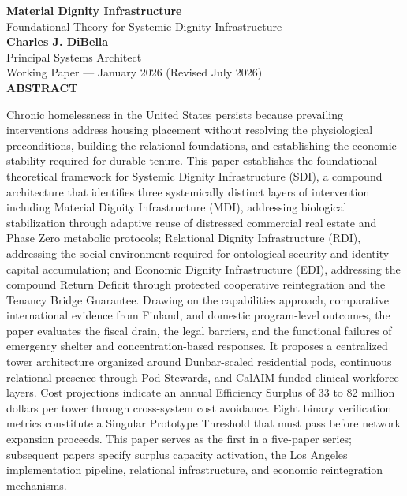 \documentclass[12pt, letterpaper]{article}
\begin{document}
\begin{titlepage}
\begin{center}
{\LARGE \textbf{Material Dignity Infrastructure}}\\[6pt]
{\large Foundational Theory for Systemic Dignity Infrastructure}\\[1.0cm]
{\normalsize \textbf{Charles J. DiBella}}\\[0.01cm]
{\normalsize Principal Systems Architect}\\[0.01cm]
{\normalsize Working Paper --- January 2026 (Revised July 2026)}\\[0.5cm]
\textbf{ABSTRACT}
\vspace{0.5cm}
\end{center}
\begin{minipage}{0.95\textwidth}
\noindent

Chronic homelessness in the United States persists because prevailing interventions address housing placement without resolving the physiological preconditions, building the relational foundations, and establishing the economic stability required for durable tenure. This paper establishes the foundational theoretical framework for Systemic Dignity Infrastructure (SDI), a compound architecture that identifies three systemically distinct layers of intervention including Material Dignity Infrastructure (MDI), addressing biological stabilization through adaptive reuse of distressed commercial real estate and Phase Zero metabolic protocols; Relational Dignity Infrastructure (RDI), addressing the social environment required for ontological security and identity capital accumulation; and Economic Dignity Infrastructure (EDI), addressing the compound Return Deficit through protected cooperative reintegration and the Tenancy Bridge Guarantee. Drawing on the capabilities approach, comparative international evidence from Finland, and domestic program-level outcomes, the paper evaluates the fiscal drain, the legal barriers, and the functional failures of emergency shelter and concentration-based responses. It proposes a centralized tower architecture organized around Dunbar-scaled residential pods, continuous relational presence through Pod Stewards, and CalAIM-funded clinical workforce layers. Cost projections indicate an annual Efficiency Surplus of 33 to 82 million dollars per tower through cross-system cost avoidance. Eight binary verification metrics constitute a Singular Prototype Threshold that must pass before network expansion proceeds. This paper serves as the first in a five-paper series; subsequent papers specify surplus capacity activation, the Los Angeles implementation pipeline, relational infrastructure, and economic reintegration mechanisms.

\end{minipage}
\end{titlepage}
\end{document}
